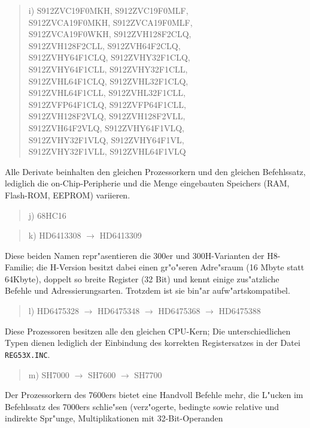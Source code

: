 \documentclass[12pt,a4paper,twoside]{report}
\newcommand{\tty}[1]{{\tt #1}}
\begin{document}
\begin{quote}
i) S912ZVC19F0MKH, S912ZVC19F0MLF,\\
   S912ZVCA19F0MKH, S912ZVCA19F0MLF,\\
   S912ZVCA19F0WKH, S912ZVH128F2CLQ,\\
   S912ZVH128F2CLL, S912ZVH64F2CLQ,\\
   S912ZVHY64F1CLQ, S912ZVHY32F1CLQ,\\
   S912ZVHY64F1CLL, S912ZVHY32F1CLL,\\
   S912ZVHL64F1CLQ, S912ZVHL32F1CLQ,\\
   S912ZVHL64F1CLL, S912ZVHL32F1CLL,\\
   S912ZVFP64F1CLQ, S912ZVFP64F1CLL,\\
   S912ZVH128F2VLQ, S912ZVH128F2VLL,\\
   S912ZVH64F2VLQ, S912ZVHY64F1VLQ,\\
   S912ZVHY32F1VLQ, S912ZVHY64F1VL,\\
   S912ZVHY32F1VLL, S912ZVHL64F1VLQ 
\end{quote}
Alle Derivate beinhalten den gleichen Prozessorkern und den
gleichen Befehlssatz, lediglich die on-Chip-Peripherie und
die Menge eingebauten Speichers (RAM, Flash-ROM, EEPROM)
variieren.
\begin{quote}
j) 68HC16
\end{quote}
\begin{quote}
k) HD6413308 $\longrightarrow$ HD6413309
\end{quote}
Diese beiden Namen repr"asentieren die 300er und 300H-Varianten der
H8-Familie; die H-Version besitzt dabei einen gr"o"seren Adre"sraum
(16 Mbyte statt 64Kbyte), doppelt so breite Register (32 Bit) und
kennt einige zus"atzliche Befehle und Adressierungsarten.  Trotzdem
ist sie bin"ar aufw"artskompatibel.
\begin{quote}
l) HD6475328 $\longrightarrow$ HD6475348 $\longrightarrow$
   HD6475368 $\longrightarrow$ HD6475388
\end{quote}
Diese Prozessoren besitzen alle den gleichen CPU-Kern; Die unterschiedlichen
Typen dienen lediglich der Einbindung des korrekten Registersatzes
in der Datei \tty{REG53X.INC}.
\begin{quote}
m) SH7000 $\longrightarrow$ SH7600 $\longrightarrow$ SH7700
\end{quote}
Der Prozessorkern des 7600ers bietet eine Handvoll Befehle mehr, die
L"ucken im Befehlssatz des 7000ers schlie"sen (verz"ogerte, bedingte
sowie relative und indirekte Spr"unge, Multiplikationen mit 32-Bit-Operanden
\end{document}
